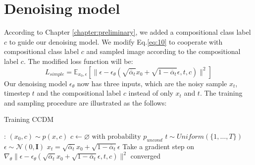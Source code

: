 \section{Denoising model}
According to Chapter \ref{chapter:preliminary}, we added a compositional class label $c$ to guide our denoising model. We modify Eq.\ref{eq:10} to cooperate with compositional class label $c$ and sampled image according to the compositional label $c$. The modified loss function will be:
\begin{equation}
    L_{simple} = \mathbb{E}_{x_0, \epsilon}[\|\epsilon - \epsilon_\theta(\sqrt{\overline{\alpha}_t}x_0 + \sqrt{1 - \overline{\alpha}_t}\epsilon, t, c)\|^2]
\end{equation}
Our denoising model $\epsilon_\theta$ now has three inputs, which are the noisy sample $x_t$, timestep $t$ and the compositional label $c$ instead of only $x_t$ and $t$. The training and sampling procedure are illustrated as the follows:
\begin{algorithm}
\caption{Training CCDM}
\label{training}
\vspace{2mm}
\begin{algorithmic}[1]
\Repeat: \vspace{2mm}
    \State $(x_0, c) \sim p(x, c)$  \vspace{2mm}
    \State $c \leftarrow \varnothing \text{ with probability } p_{uncond}$
    \State $t \sim Uniform(\{1, \dots, T\})$ \vspace{2mm}
    \State $\epsilon \sim \mathcal{N}(0, \textbf{I})$ \vspace{2mm}
    \State $x_t = \sqrt{\overline{\alpha}_t}x_0 + \sqrt{1 - \overline{\alpha}_t}\epsilon$ \vspace{2mm}
    \State Take a gradient step on $ \nabla_{\theta} \| \epsilon - \epsilon_\theta(\sqrt{\overline{\alpha}_t}x_0 + \sqrt{1 - \overline{\alpha}_t}\epsilon, t, c) \|^2 $ \vspace{2mm}
    \Until converged \vspace{2mm}
\end{algorithmic}
\end{algorithm}

